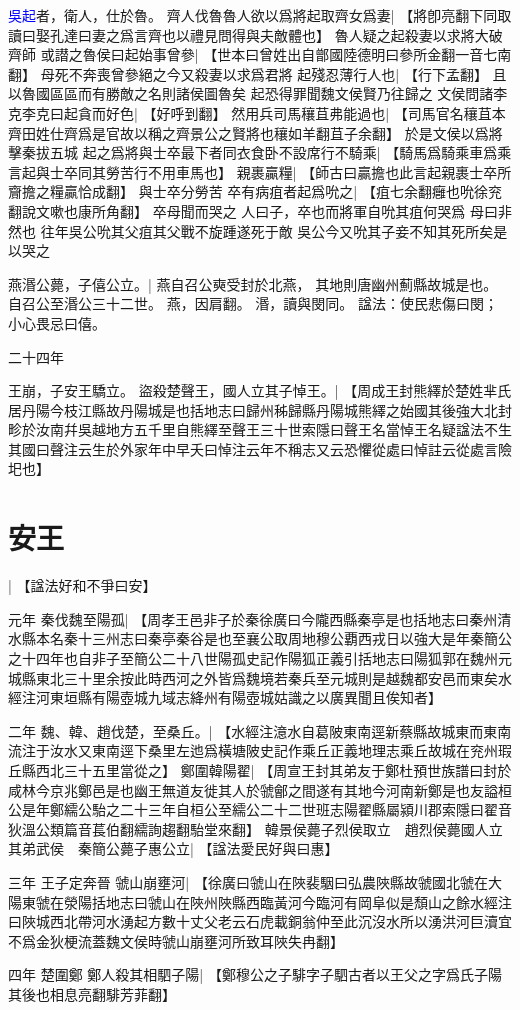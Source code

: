 \textcolor{blue}{吳起}者，衛人，仕於魯。
齊人伐魯魯人欲以爲將起取齊女爲妻|{
	【將卽亮翻下同取讀曰娶孔達曰妻之爲言齊也以禮見問得與夫敵體也】
	}
魯人疑之起殺妻以求將大破齊師
或譛之魯侯曰起始事曾參|{
	【世本曰曾姓出自鄫國陸德明曰參所金翻一音七南翻】
	}
母死不奔喪曾參絕之今又殺妻以求爲君將
起殘忍薄行人也|{
	【行下孟翻】
	}
且以魯國區區而有勝敵之名則諸侯圖魯矣
起恐得罪聞魏文侯賢乃往歸之
文侯問諸李克李克曰起貪而好色|{
	【好呼到翻】}
然用兵司馬穰苴弗能過也|{
	【司馬官名穰苴本齊田姓仕齊爲是官故以稱之齊景公之賢將也穰如羊翻苴子余翻】
	}
於是文侯以爲將擊秦拔五城
起之爲將與士卒最下者同衣食卧不設席行不騎乘|{
	【騎馬爲騎乘車爲乘言起與士卒同其勞苦行不用車馬也】}
親裹贏糧|{
	【師古曰贏擔也此言起親裹士卒所齎擔之糧贏恰成翻】}
與士卒分勞苦
卒有病疽者起爲吮之|{
	【疽七余翻癰也吮徐兖翻說文嗽也康所角翻】}
卒母聞而哭之
人曰子，卒也而將軍自吮其疽何哭爲
母曰非然也
往年吳公吮其父疽其父戰不旋踵遂死于敵
吳公今又吮其子妾不知其死所矣是以哭之

燕湣公薨，子僖公立。|{
	燕自召公奭受封於北燕，
	其地則唐幽州薊縣故城是也。
	自召公至湣公三十二世。
	燕，因肩翻。
	湣，讀與閔同。
	諡法：使民悲傷曰閔；
	小心畏忌曰僖。
	}


二十四年

王崩，子安王驕立。
盜殺楚聲王，國人立其子悼王。|{
	【周成王封熊繹於楚姓芈氏居丹陽今枝江縣故丹陽城是也括地志曰歸州秭歸縣丹陽城熊繹之始國其後強大北封畛於汝南幷吳越地方五千里自熊繹至聲王三十世索隱曰聲王名當悼王名疑諡法不生其國曰聲注云生於外家年中早夭曰悼注云年不稱志又云恐懼從處曰悼註云從處言險圯也】}
\par
\section{安王}|{
	【諡法好和不爭曰安】
	}
\par 元年
秦伐魏至陽孤|{
	【周孝王邑非子於秦徐廣曰今隴西縣秦亭是也括地志曰秦州清水縣本名秦十三州志曰秦亭秦谷是也至襄公取周地穆公覇西戎日以強大是年秦簡公之十四年也自非子至簡公二十八世陽孤史記作陽狐正義引括地志曰陽狐郭在魏州元城縣東北三十里余按此時西河之外皆爲魏境若秦兵至元城則是越魏都安邑而東矣水經注河東垣縣有陽壺城九域志絳州有陽壺城姑識之以廣異聞且俟知者】}
\par 二年
魏、韓、趙伐楚，至桑丘。|{
	【水經注澺水自葛陂東南逕新蔡縣故城東而東南流注于汝水又東南逕下桑里左迆爲橫塘陂史記作乘丘正義地理志乘丘故城在兖州瑕丘縣西北三十五里當從之】}
鄭圍韓陽翟|{
	【周宣王封其弟友于鄭杜預世族譜曰封於咸林今京兆鄭邑是也幽王無道友徙其人於虢鄶之間遂有其地今河南新鄭是也友謚桓公是年鄭繻公駘之二十三年自桓公至繻公二十二世班志陽翟縣屬潁川郡索隱曰翟音狄溫公類篇音萇伯翻繻詢趨翻駘堂來翻】}
韓景侯薨子烈侯取立　趙烈侯薨國人立其弟武侯　秦簡公薨子惠公立|{
	【諡法愛民好與曰惠】}
\par 三年
王子定奔晉
虢山崩壅河|{
	【徐廣曰虢山在陜裴駰曰弘農陜縣故虢國北虢在大陽東虢在滎陽括地志曰虢山在陜州陜縣西臨黃河今臨河有岡阜似是頹山之餘水經注曰陜城西北帶河水湧起方數十丈父老云石虎載銅翁仲至此沉沒水所以湧洪河巨瀆宜不爲金狄梗流蓋魏文侯時虢山崩壅河所致耳陜失冉翻】}
\par 四年
楚圍鄭
鄭人殺其相駟子陽|{
	【鄭穆公之子騑字子駟古者以王父之字爲氏子陽其後也相息亮翻騑芳菲翻】}


